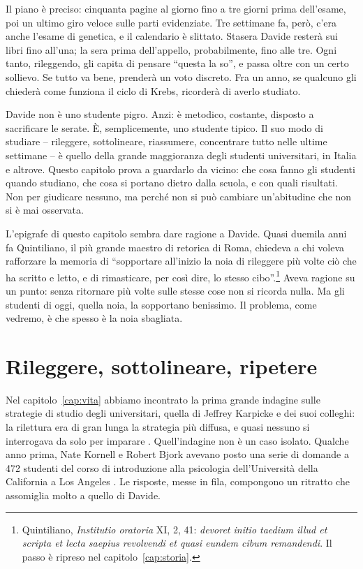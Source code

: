 Il piano è preciso: cinquanta pagine al giorno fino a tre giorni prima
dell'esame, poi un ultimo giro veloce sulle parti evidenziate. Tre
settimane fa, però, c'era anche l'esame di genetica, e il calendario è
slittato. Stasera Davide resterà sui libri fino all'una; la sera prima
dell'appello, probabilmente, fino alle tre. Ogni tanto, rileggendo, gli
capita di pensare \enquote{questa la so}, e passa oltre con un certo
sollievo. Se tutto va bene, prenderà un voto discreto. Fra un anno, se
qualcuno gli chiederà come funziona il ciclo di Krebs, ricorderà di
averlo studiato.

Davide non è uno studente pigro. Anzi: è metodico, costante, disposto a
sacrificare le serate. È, semplicemente, uno studente tipico. Il suo
modo di studiare -- rileggere, sottolineare, riassumere, concentrare
tutto nelle ultime settimane -- è quello della grande maggioranza degli
studenti universitari, in Italia e altrove. Questo capitolo prova a
guardarlo da vicino: che cosa fanno gli studenti quando studiano, che
cosa si portano dietro dalla scuola, e con quali risultati. Non per
giudicare nessuno, ma perché non si può cambiare un'abitudine che non
si è mai osservata.

L'epigrafe di questo capitolo sembra dare ragione a Davide. Quasi
duemila anni fa Quintiliano, il più grande maestro di retorica di Roma,
chiedeva a chi voleva rafforzare la memoria di \enquote{sopportare
all'inizio la noia di rileggere più volte ciò che ha scritto e letto, e
di rimasticare, per così dire, lo stesso cibo}.\footnote{Quintiliano,
\emph{Institutio oratoria} XI, 2, 41: \emph{devoret initio taedium illud
et scripta et lecta saepius revolvendi et quasi eundem cibum
remandendi}. Il passo è ripreso nel capitolo~\ref{cap:storia}.} Aveva
ragione su un punto: senza ritornare più volte sulle stesse cose non si
ricorda nulla. Ma gli studenti di oggi, quella noia, la sopportano
benissimo. Il problema, come vedremo, è che spesso è la noia sbagliata.

\section{Rileggere, sottolineare, ripetere}

Nel capitolo~\ref{cap:vita} abbiamo incontrato la prima grande
indagine sulle strategie di studio degli universitari, quella di Jeffrey
Karpicke e dei suoi colleghi: la rilettura era di gran lunga la
strategia più diffusa, e quasi nessuno si interrogava da solo per
imparare \parencite{karpicke2009}. Quell'indagine non è un caso isolato.
Qualche anno prima, Nate Kornell e Robert Bjork avevano posto una
serie di domande a 472 studenti del corso di introduzione alla
psicologia dell'Università della California a Los Angeles
\parencite{kornell2007}. Le risposte, messe in fila, compongono un
ritratto che assomiglia molto a quello di Davide.

